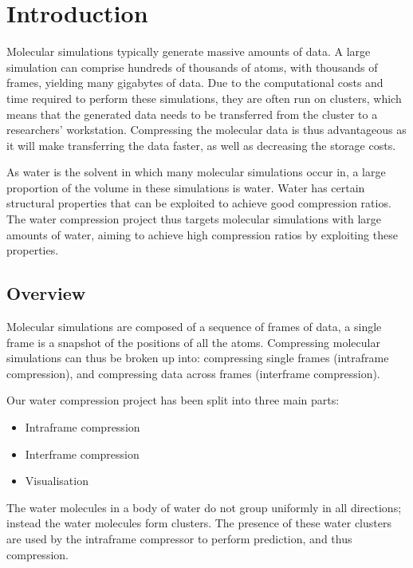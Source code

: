 \graphicspath{{./introduction/}}

\chapter{Introduction}
\label{cha:introduction}

Molecular simulations typically generate massive amounts of data. A large
simulation can comprise hundreds of thousands of atoms, with thousands of
frames, yielding many gigabytes of data. Due to the computational costs and
time required to perform these simulations, they are often run on clusters,
which means that the generated data needs to be transferred from the cluster to
a researchers' workstation. Compressing the molecular data is thus advantageous
as it will make transferring the data faster, as well as decreasing the storage
costs.

As water is the solvent in which many molecular simulations occur in, a large
proportion of the volume in these simulations is water. Water has certain
structural properties that can be exploited to achieve good compression ratios.
The water compression project thus targets molecular simulations with large
amounts of water, aiming to achieve high compression ratios by exploiting these
properties.

\section{Overview}
\label{sec:introduction_overview}

Molecular simulations are composed of a sequence of frames of data, a single
frame is a snapshot of the positions of all the atoms. Compressing molecular
simulations can thus be broken up into: compressing single frames (intraframe
compression), and compressing data across frames (interframe compression).

Our water compression project has been split into three main parts:

\begin{itemize}
  \item Intraframe compression
  \item Interframe compression
  \item Visualisation
\end{itemize}

The water molecules in a body of water do not group uniformly in all
directions; instead the water molecules form clusters. The presence of these
water clusters are used by the intraframe compressor to perform prediction, and
thus compression.

